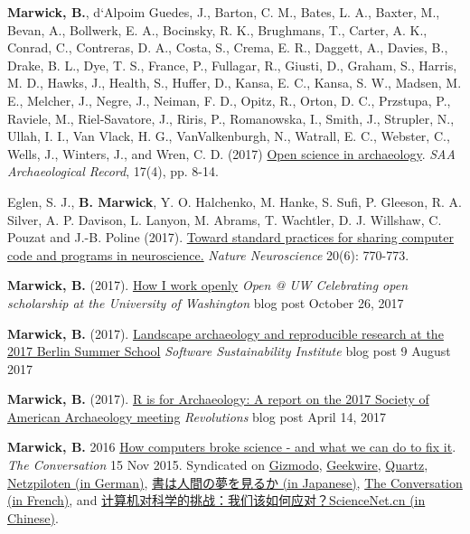 \documentclass[11pt,article,oneside]{memoir}
\begin{document}
{{{\ind \textbf{Marwick, B.}, d`Alpoim Guedes, J., Barton, C. M., Bates, L. A., Baxter, M., Bevan, A., Bollwerk, E. A., Bocinsky, R. K., Brughmans, T., Carter, A. K., Conrad, C., Contreras, D. A., Costa, S., Crema, E. R., Daggett, A., Davies, B., Drake, B. L., Dye, T. S., France, P., Fullagar, R., Giusti, D., Graham, S., Harris, M. D., Hawks, J., Health, S., Huffer, D., Kansa, E. C., Kansa, S. W., Madsen, M. E., Melcher, J., Negre, J., Neiman, F. D., Opitz, R., Orton, D. C., Przstupa, P., Raviele, M., Riel-Savatore, J., Riris, P., Romanowska, I., Smith, J., Strupler, N., Ullah, I. I., Van Vlack, H. G., VanValkenburgh, N., Watrall, E. C., Webster, C., Wells, J., Winters, J., and Wren, C. D. (2017) \href{http://www.saa.org/Portals/0/SAA\_Record\_Sept\_2017\_Final\_LR.pdf\#page\=10}{Open science in archaeology}. \textit{SAA Archaeological Record}, 17(4), pp. 8-14. 

\ind Eglen, S. J., \textbf{B. Marwick}, Y. O. Halchenko, M. Hanke, S. Sufi, P. Gleeson, R. A. Silver, A. P. Davison, L. Lanyon, M. Abrams, T. Wachtler, D. J. Willshaw, C. Pouzat and J.-B. Poline (2017). \href{http://www.nature.com/neuro/journal/v20/n6/full/nn.4550.html}{Toward standard practices for sharing computer code and programs in neuroscience.} \textit{Nature Neuroscience} 20(6): 770-773.

\ind \textbf{Marwick, B.} (2017). \href{https://blogs.uw.edu/openpub/2017/10/26/how-i-work-open-ben-marwick/}{How I work openly} \textit{Open @ UW Celebrating open scholarship at the University of Washington} blog post October 26, 2017 

\ind \textbf{Marwick, B.} (2017). \href{https://www.software.ac.uk/blog/2017-08-09-landscape-archaeology-and-reproducible-research-2017-berlin-summer-school}{Landscape archaeology and reproducible research at the 2017 Berlin Summer School} \textit{Software Sustainability Institute} blog post 9 August 2017 

\ind \textbf{Marwick, B.} (2017). \href{http://blog.revolutionanalytics.com/2017/04/r-is-for-archaeology.html}{R is for Archaeology: A report on the 2017 Society of American Archaeology meeting} \textit{Revolutions} blog post April 14, 2017 

\ind \textbf{Marwick, B.} 2016 \href{https://theconversation.com/how-computers-broke-science-and-what-we-can-do-to-fix-it-49938}{How computers broke science - and what we can do to fix it}. \textit{The Conversation} 15 Nov 2015.  Syndicated on \href{http://gizmodo.com/how-computers-broke-science-and-what-we-can-do-to-fix-i-1741649207}{Gizmodo}, \href{http://www.geekwire.com/2015/how-computers-broke-science-and-what-we-can-do-to-fix-it/}{Geekwire}, \href{http://qz.com/548730/computers-are-making-science-extremely-challenging-for-scientists/}{Quartz}, \href{http://www.netzpiloten.de/wissenschaft-computer-reproduzierbarkeit-probleme/}{Netzpiloten (in German)}, \href{http://filled-with-deities.hatenablog.jp/entry/2015/11/17/202013}{書は人間の夢を見るか (in Japanese)}, \href{https://theconversation.com/les-ordinateurs-nuisent-gravement-a-la-science-mais-il-est-possible-dy-remedier-1-52024}{The Conversation (in French)}, and \href{http://news.sciencenet.cn/htmlnews/2017/8/385497.shtm}{计算机对科学的挑战：我们该如何应对？ScienceNet.cn (in Chinese)}.

}}}
\end{document}
